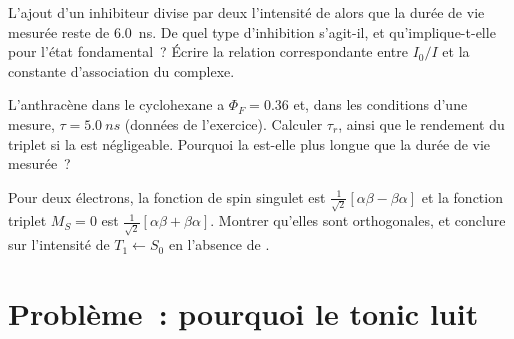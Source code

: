 \begin{exercise}[$\star\star\star$]\label{exo:b3:electronic-spectroscopy:10}
L'ajout d'un inhibiteur divise par deux l'intensité de  alors
que la durée de vie mesurée reste de \qty{6.0}{ns}. De quel type
d'inhibition s'agit-il, et qu'implique-t-elle pour l'état fondamental~?
Écrire la relation correspondante entre $I_0/I$
et la constante d'association du complexe.
\end{exercise}

\begin{exercise}[$\star\star\star$]\label{exo:b3:electronic-spectroscopy:11}
L'anthracène dans le cyclohexane a $\Phi_F = 0.36$ et, dans les
conditions d'une mesure, $\tau = \qty{5.0}{ns}$ (données de l'exercice).
Calculer $\tau_r$, ainsi que le rendement du triplet si la  est négligeable. Pourquoi la  est-elle plus
longue que la durée de vie mesurée~?
\end{exercise}

\begin{exercise}[$\star\star\star$]\label{exo:b3:electronic-spectroscopy:12}
Pour deux électrons, la fonction de spin singulet est $\frac{1}{\sqrt2}[\alpha\beta - \beta\alpha]$
et la fonction triplet $M_S = 0$ est $\frac{1}{\sqrt2}[\alpha\beta + \beta\alpha]$.
Montrer qu'elles sont orthogonales, et conclure sur l'intensité de
$T_1 \leftarrow S_0$ en l'absence de .
\end{exercise}

\section{Problème~: pourquoi le tonic luit}

